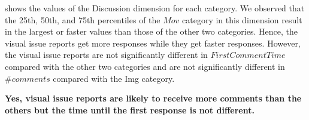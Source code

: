 shows the values of the Discussion dimension
for each category. 
We observed that the 25th, 50th, and 75th percentiles of 
the $Mov$ category in 
this dimension
result in the largest or faster values than those of 
the other two categories.
Hence, the visual issue reports get more responses 
while they get faster responses. 
However, the visual issue reports are not 
significantly different in $FirstCommentTime$ 
compared with the other two categories and 
are not significantly different in $\#comments$ 
compared with the Img category.

\summarybox
{\bf Yes, visual issue reports are likely to receive more comments than the others but the time until the first response is not different. 
}










